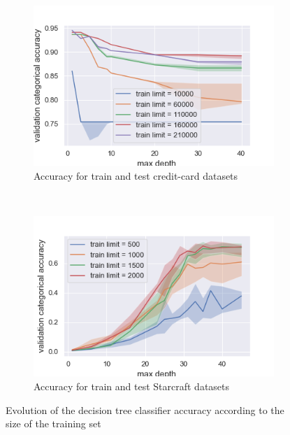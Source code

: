 \documentclass[10pt]{article}
\begin{document}
		\begin{figure}[]
			\centering
			\begin{subfigure}[]{0.45\columnwidth}
				\centering
				\includegraphics[width=\linewidth]{../graphics/tree_creditcard_max_depth_score_type_train_limit.png}
				\caption{Accuracy for train and test credit-card datasets}
				\label{tree:cc_train_size_score_type_score_type}
			\end{subfigure}
			~
			\begin{subfigure}[]{0.45\columnwidth}
				\centering
				\includegraphics[width=\linewidth]{../graphics/tree_starcraft_max_depth_score_type_train_limit.png}
				\caption{Accuracy for train and test Starcraft datasets}
				\label{tree:sc_train_size_score_type_score_type}
			\end{subfigure}
			\caption{Evolution of the decision tree classifier accuracy according to the size of the training set}
			\label{tree:train_size_score_type_score_type}
		\end{figure}
\end{document}

